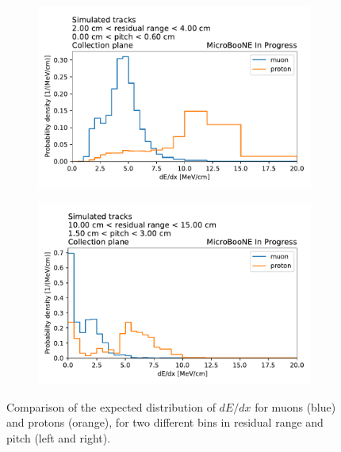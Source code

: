 \documentclass[a4paper]{article}
\begin{document}
\begin{figure}[ht] 
\begin{center}
    \begin{subfigure}[b]{0.48\textwidth}
    \centering
    \includegraphics[width=1.00\textwidth]{llrpid/plane_2_rr_30_pitch_03.pdf}
    \end{subfigure}
    \begin{subfigure}[b]{0.48\textwidth}
    \centering
    \includegraphics[width=1.00\textwidth]{llrpid/plane_2_rr_125_pitch_225.pdf}
    \end{subfigure}
\caption{Comparison of the expected distribution of $dE/dx$ for muons (blue) and protons (orange), for two different bins in residual range and pitch (left and right).}
\label{fig:llr_pid_pdf_example}
\end{center}
\end{figure}
\end{document}
